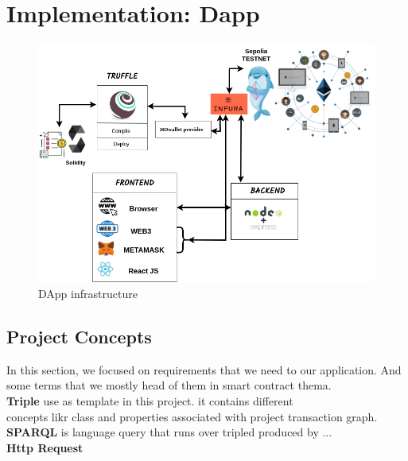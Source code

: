 \chapter{Implementation: Dapp}
\begin{center}
	
	\begin{figure}[htb!]
		
		\begin{minipage}{0.75\linewidth}
			
			\includegraphics[width=1.45\textwidth]{images/chap03_dapp.png}
		\end{minipage}
		\caption{DApp infrastructure}
		
	\end{figure}
	
\end{center}
\section{Project Concepts}

In this section, we focused on requirements that we need to  our application.
And some terms that we mostly head of them in smart contract thema.\\
\textbf{Triple} use as template in this project. it contains different \\ concepts likr class and properties associated with project transaction graph.\\
\textbf{SPARQL} is language query that runs over tripled produced by ...\\

\textbf{Http Request} 
